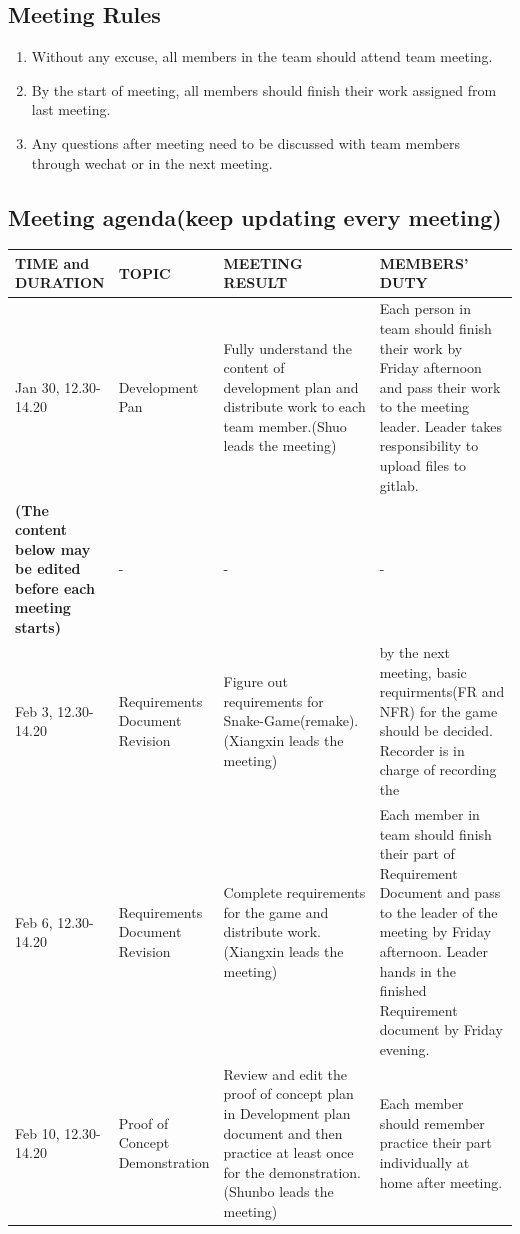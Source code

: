 \documentclass{article}
\begin{document}
\subsection{Meeting Rules}
	\begin{enumerate}
	\item Without any excuse, all members in the team should attend team meeting.
	\item By the start of meeting, all members should finish their work assigned from last meeting.
	\item Any questions after meeting need to be discussed with team members through wechat or in the next meeting.
	\end{enumerate}
\subsection{Meeting agenda(keep updating every meeting)}
\begin{tabular}{ |p{0.15\linewidth}|p{0.20\linewidth}|p{0.35\linewidth}|p{0.30\linewidth}| }
        \hline
        \rowcolor[HTML]{C0C0C0}
        \textbf{TIME and DURATION} & \textbf{TOPIC} & \textbf{MEETING RESULT} & \textbf{MEMBERS' DUTY} \\ \hline
        Jan 30, 12.30-14.20 & Development Pan & Fully understand the content of development plan and distribute work to each team member.(Shuo leads the meeting) & Each person in team should finish their work by Friday afternoon and pass their work to the meeting leader. Leader takes responsibility to upload files to gitlab.  \\


        \rowcolor[HTML]{C0C0C0}
        \textbf{(The content below may be edited before each meeting starts)} & - & - & - \\

        \hline
        Feb 3, 12.30-14.20 & Requirements Document Revision & Figure out requirements for Snake-Game(remake). (Xiangxin leads the meeting) & by the next meeting, basic requirments(FR and NFR) for the game should be decided. Recorder is in charge of recording the \\
        \hline
        Feb 6, 12.30-14.20 & Requirements Document Revision & Complete requirements for the game and distribute work.(Xiangxin leads the meeting)  & Each member in team should finish their part of Requirement Document and pass to the leader of the meeting by Friday afternoon. Leader hands in the finished Requirement document by Friday evening.\\
        \hline
        Feb 10, 12.30-14.20 & Proof of Concept Demonstration & Review and edit the proof of concept plan in Development plan document and then practice at least once for the demonstration.(Shunbo leads the meeting) & Each member should remember practice their part individually at home after meeting. \\
        \hline
        \end{tabular}
\end{document}

